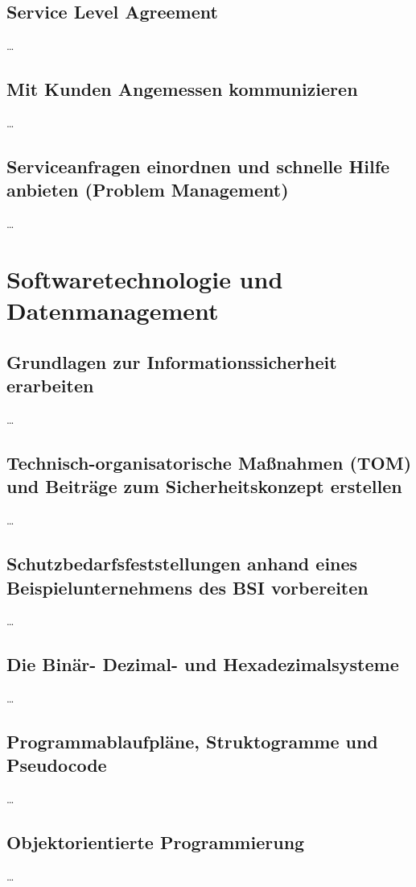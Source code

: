 \documentclass[a4paper, 12pt]{report}
\begin{document}
\section{Service Level Agreement}
\dots

\section{Mit Kunden Angemessen kommunizieren}
\dots

\section{Serviceanfragen einordnen und schnelle Hilfe anbieten (Problem Management)}
\dots


\chapter{Softwaretechnologie und Datenmanagement}

\section{Grundlagen zur Informationssicherheit erarbeiten}
\dots

\section{Technisch-organisatorische Maßnahmen (TOM) und Beiträge zum Sicherheitskonzept erstellen}
\dots

\section{Schutzbedarfsfeststellungen anhand eines Beispielunternehmens des BSI vorbereiten}
\dots

\section{Die Binär- Dezimal- und Hexadezimalsysteme}
\dots

\section{Programmablaufpläne, Struktogramme und Pseudocode}
\dots

\section{Objektorientierte Programmierung}
\dots
\end{document}
